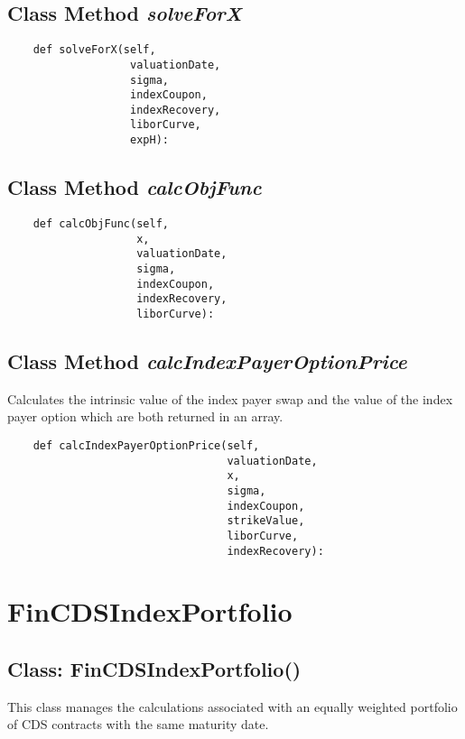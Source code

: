 \documentclass[twoside,11pt]{book}
\begin{document}
\subsection{Class Method {\it solveForX}}


\begin{lstlisting}
    def solveForX(self,
                   valuationDate,
                   sigma,
                   indexCoupon,
                   indexRecovery,
                   liborCurve,
                   expH):
\end{lstlisting}

\subsection{Class Method {\it calcObjFunc}}


\begin{lstlisting}
    def calcObjFunc(self,
                    x,
                    valuationDate,
                    sigma,
                    indexCoupon,
                    indexRecovery,
                    liborCurve):
\end{lstlisting}

\subsection{Class Method {\it calcIndexPayerOptionPrice}}
Calculates the intrinsic value of the index payer swap and the value of the index payer option which are both returned in an array. 

\begin{lstlisting}
    def calcIndexPayerOptionPrice(self, 
                                  valuationDate,
                                  x,
                                  sigma,
                                  indexCoupon,
                                  strikeValue,
                                  liborCurve,
                                  indexRecovery):
\end{lstlisting}

\newpage
\section{FinCDSIndexPortfolio}

\subsection{Class: FinCDSIndexPortfolio()}
This class manages the calculations associated with an equally weighted portfolio of CDS contracts with the same maturity date. 
\end{document}
